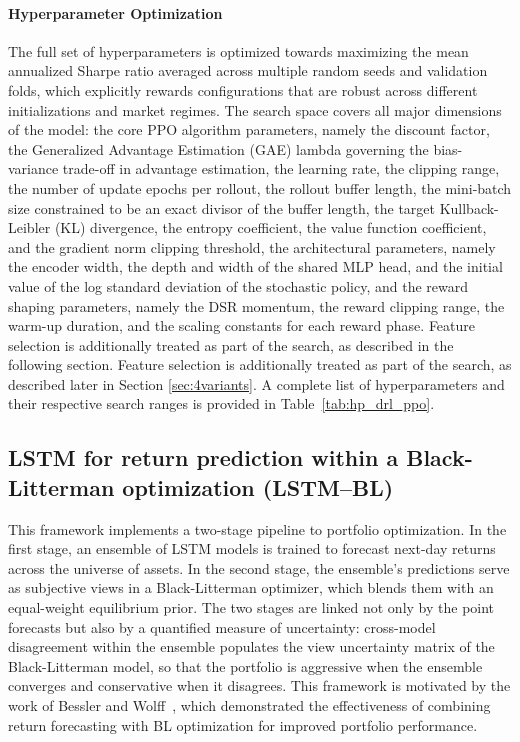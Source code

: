 \paragraph{Hyperparameter Optimization} The full set of hyperparameters is optimized towards maximizing the mean annualized Sharpe ratio averaged across multiple random seeds and validation folds, which explicitly rewards configurations that are robust across different initializations and market regimes. The search space covers all major dimensions of the model: the core PPO algorithm parameters, namely the discount factor, the Generalized Advantage Estimation (GAE) lambda governing the bias-variance trade-off in advantage estimation, the learning rate, the clipping range, the number of update epochs per rollout, the rollout buffer length, the mini-batch size constrained to be an exact divisor of the buffer length, the target Kullback-Leibler (KL) divergence, the entropy coefficient, the value function coefficient, and the gradient norm clipping threshold, the architectural parameters, namely the encoder width, the depth and width of the shared MLP head, and the initial value of the log standard deviation of the stochastic policy, and the reward shaping parameters, namely the DSR momentum, the reward clipping range, the warm-up duration, and the scaling constants for each reward phase. Feature selection is additionally treated as part of the search, as described in the following section. Feature selection is additionally treated as part of the search, as described later in Section \ref{sec:4variants}. A complete list of hyperparameters and their respective search ranges is provided in Table~\ref{tab:hp_drl_ppo}.

\subsection{LSTM for return prediction within a Black-Litterman optimization (LSTM--BL)}

This framework implements a two-stage pipeline to portfolio optimization. In the first stage, an ensemble of LSTM models is trained to forecast next-day returns across the universe of assets. In the second stage, the ensemble's predictions serve as subjective views in a Black-Litterman optimizer, which blends them with an equal-weight equilibrium prior. The two stages are linked not only by the point forecasts but also by a quantified measure of uncertainty: cross-model disagreement within the ensemble populates the view uncertainty matrix of the Black-Litterman model, so that the portfolio is aggressive when the ensemble converges and conservative when it disagrees. This framework is motivated by the work of Bessler and Wolff~\cite{83780}, which demonstrated the effectiveness of combining return forecasting with BL optimization for improved portfolio performance.

